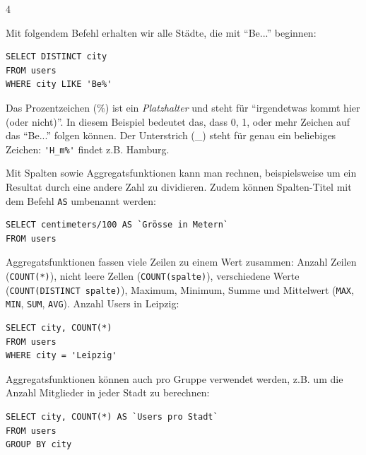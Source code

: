 \begin{landscape}
\begin{multicols*}{4}
\begin{cheatSheetBox}[title=Ungefähre Treffer: \texorpdfstring{\lstinline|LIKE|}{LIKE}]
Mit folgendem Befehl erhalten wir alle Städte, die mit \enquote{Be...} beginnen:
\begin{lstlisting}
SELECT DISTINCT city
FROM users
WHERE city LIKE 'Be%'
\end{lstlisting}
Das Prozentzeichen (\%) ist ein \textit{Platzhalter} und steht für \enquote{irgendetwas kommt hier (oder nicht)}. In diesem Beispiel bedeutet das, dass 0, 1, oder mehr Zeichen auf das \enquote{Be...} folgen können. Der Unterstrich (\_) steht für genau ein beliebiges Zeichen: \lstinline|'H_m%'| findet z.B. Hamburg.
\end{cheatSheetBox}
\begin{cheatSheetBox}[title=Rechnen und umbenennen: \texorpdfstring{\lstinline|AS|}{AS}]
Mit Spalten sowie Aggregatsfunktionen kann man rechnen, beispielsweise um ein Resultat durch eine andere Zahl zu dividieren. Zudem können Spalten-Titel mit dem Befehl \lstinline|AS| umbenannt werden:
\begin{lstlisting}
SELECT centimeters/100 AS `Grösse in Metern`
FROM users
\end{lstlisting}
\end{cheatSheetBox}

\begin{cheatSheetBox}[title=Aggregatsfunktionen]
Aggregatsfunktionen fassen viele Zeilen zu einem Wert zusammen: Anzahl Zeilen (\lstinline|COUNT(*)|), nicht leere Zellen (\lstinline|COUNT(spalte)|), verschiedene Werte (\lstinline|COUNT(DISTINCT spalte)|), Maximum, Minimum, Summe und Mittelwert (\lstinline|MAX|, \lstinline|MIN|, \lstinline|SUM|, \lstinline|AVG|). Anzahl Users in Leipzig:
\begin{lstlisting}
SELECT city, COUNT(*)
FROM users
WHERE city = 'Leipzig'
\end{lstlisting}
\end{cheatSheetBox}

\begin{cheatSheetBox}[title=Gruppieren: \texorpdfstring{\lstinline|GROUP BY|}{GROUP BY}]
Aggregatsfunktionen können auch pro Gruppe verwendet werden, z.B. um die Anzahl Mitglieder in jeder Stadt zu berechnen:
\begin{lstlisting}
SELECT city, COUNT(*) AS `Users pro Stadt`
FROM users
GROUP BY city
\end{lstlisting}
\end{cheatSheetBox}


\end{multicols*}
\end{landscape}
